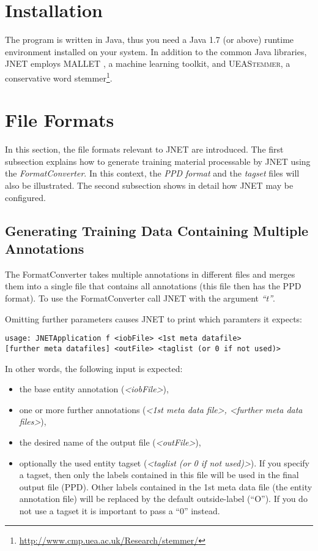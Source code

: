 \documentclass[11pt,a4paper,halfparskip]{scrartcl}
\begin{document}
\section{Installation}
The program is written in Java, thus you need a Java 1.7 (or
above) runtime environment installed on your system. In addition to
the common Java libraries, JNET employs \textsc{MALLET}
\cite{McCallum2002}, a machine learning toolkit, and
\textsc{UEAStemmer}, a conservative word
stemmer\footnote{\url{http://www.cmp.uea.ac.uk/Research/stemmer/}}.

\section{File Formats}
\label{sec_formats}
In this section, the file formats relevant to JNET are introduced. The
first subsection explains how to generate training material
processable by JNET using the \textit{FormatConverter}. In this
context, the \textit{PPD format} and the \textit{tagset} files will
also be illustrated. The second subsection shows in detail how JNET
may be configured.


\subsection{Generating Training Data Containing Multiple Annotations}
\label{ssec_formatconverter}
The FormatConverter takes multiple annotations in different files and
merges them into a single file that contains all annotations (this
file then has the PPD format). To use the FormatConverter call JNET
with the argument \textit{``t''}.

Omitting further parameters causes JNET to print which paramters it
expects:
\begin{verbatim}
usage: JNETApplication f <iobFile> <1st meta datafile>
[further meta datafiles] <outFile> <taglist (or 0 if not used)>
\end{verbatim}

In other words, the following input is expected:
\begin{itemize}
\item the base entity annotation (\textit{<iobFile>}),
\item one or more further annotations (\textit{<1st meta data file>,
    <further meta data files>}),
\item the desired name of the output file (\textit{<outFile>}),
\item optionally the used entity tagset (\textit{<taglist (or 0 if not
    used)>}). If you specify a tagset, then only the labels contained
  in this file will be used in the final output file (PPD). Other
  labels contained in the 1st meta data file (the entity annotation
  file) will be replaced by the default outside-label (``O'').  If you
  do not use a tagset it is important to pass a ``0'' instead.
\end{itemize}
\end{document}
